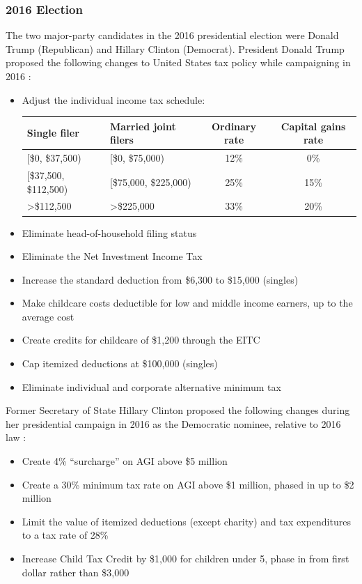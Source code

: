 \documentclass[12pt]{article}
\begin{document}
\subsubsection{2016 Election}

The two major-party candidates in the 2016 presidential election were Donald Trump (Republican) and Hillary Clinton (Democrat). President Donald Trump proposed the following changes to United States tax policy while campaigning in 2016 \citep{Trump}:
\begin{itemize}
    \item Adjust the individual income tax schedule:
        \begin{center}
        \footnotesize
        \begin{tabular}{p{2.6cm}p{2.8cm}cc}
         \toprule
         Single filer & Married joint filers & Ordinary rate & Capital gains rate\\
         \midrule
         {[\$0, \$37,500)} & {[\$0, \$75,000)} & 12\% & 0\%\\
         {[\$37,500, \$112,500)} & {[\$75,000, \$225,000)} & 25\% & 15\%\\
         >\$112,500 & >\$225,000 & 33\% & 20\%\\
         \bottomrule
        \end{tabular}
        \end{center}
    \item Eliminate head-of-household filing status
    \item Eliminate the Net Investment Income Tax
    \item Increase the standard deduction from \$6,300 to \$15,000 (singles)
    \item Make childcare costs deductible for low and middle income earners, up to the average cost
    \item Create credits for childcare of \$1,200 through the EITC
    \item Cap itemized deductions at \$100,000 (singles)
    \item Eliminate individual and corporate alternative minimum tax
\end{itemize}

Former Secretary of State Hillary Clinton proposed the following changes during her presidential campaign in 2016 as the Democratic nominee, relative to 2016 law \citep{Clinton}:
\begin{itemize}
    \item Create 4\% ``surcharge'' on AGI above \$5 million
    \item Create a 30\% minimum tax rate on AGI above \$1 million, phased in up to \$2 million
    \item Limit the value of itemized deductions (except charity) and tax expenditures to a tax rate of 28\%
    \item Increase Child Tax Credit by \$1,000 for children under 5, phase in from first dollar rather than \$3,000
\end{itemize}
\end{document}
